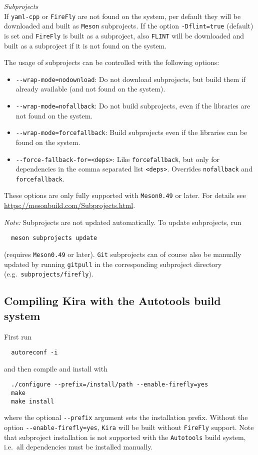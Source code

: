 \documentclass[11pt,a4paper,DIV=11,numbers=noenddot,parskip=half]{scrartcl}
\newcommand{\code}[1]{\texttt{#1}}
\newcommand*{\kira}{\code{Kira}}
\newcommand*{\firefly}{\code{FireFly}}
\newcommand*{\flint}{\code{FLINT}}
\begin{document}
\medskip\pagebreak[2]
\noindent
\textit{Subprojects}\smallskip\\
%
If \code{yaml-cpp} or \code{FireFly} are not found on the system, per default
they will be downloaded and built as \code{Meson} subprojects.
If the option \code{-Dflint=true} (default) is set and \code{FireFly} is built
as a subproject, also \flint{} will be downloaded and built as a subproject
if it is not found on the system.

The usage of subprojects can be controlled with the following options:
%
\begin{itemize}
  \item \code{-{}-wrap-mode=nodownload}:
    Do not download subprojects, but build them if already available
    (and not found on the system).
  \item \code{-{}-wrap-mode=nofallback}:
    Do not build subprojects, even if the libraries are not found on the system.
  \item \code{-{}-wrap-mode=forcefallback}:
    Build subprojects even if the libraries can be found on the system.
  \item \code{-{}-force-fallback-for=<deps>}:
    Like \code{forcefallback}, but only for dependencies in the comma separated
    list \code{<deps>}. Overrides \code{nofallback} and \code{forcefallback}.
\end{itemize}
%
These options are only fully supported with \code{Meson}\;\code{0.49} or later.
For details see\\
\url{https://mesonbuild.com/Subprojects.html}.

\textit{Note:}
Subprojects are not updated automatically.
To update subprojects, run
\begin{verbatim}
  meson subprojects update
\end{verbatim}
(requires \code{Meson}\;\code{0.49} or later).
\code{Git} subprojects can of course also be manually updated by running
\code{git}\;\code{pull} in the corresponding subproject directory
(e.g.\ \code{subprojects/firefly}).


\subsection{Compiling Kira with the Autotools build system}
\label{installwithautotools}

First run
\begin{verbatim}
  autoreconf -i
\end{verbatim}
%
and then compile and install with
\begin{verbatim}
  ./configure --prefix=/install/path --enable-firefly=yes
  make
  make install
\end{verbatim}
%
where the optional \code{-{}-prefix} argument sets the installation prefix.
Without the option \code{-{}-enable-firefly=yes}, \kira{} will be built without
\firefly{} support.
Note that subproject installation is not supported with the \code{Autotools}
build system, i.e.\ all dependencies must be installed manually.
\end{document}
